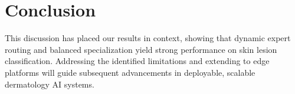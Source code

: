\section{Conclusion}
This discussion has placed our results in context, showing that dynamic expert routing and balanced specialization yield strong performance on skin lesion classification. Addressing the identified limitations and extending to edge platforms will guide subsequent advancements in deployable, scalable dermatology AI systems.


